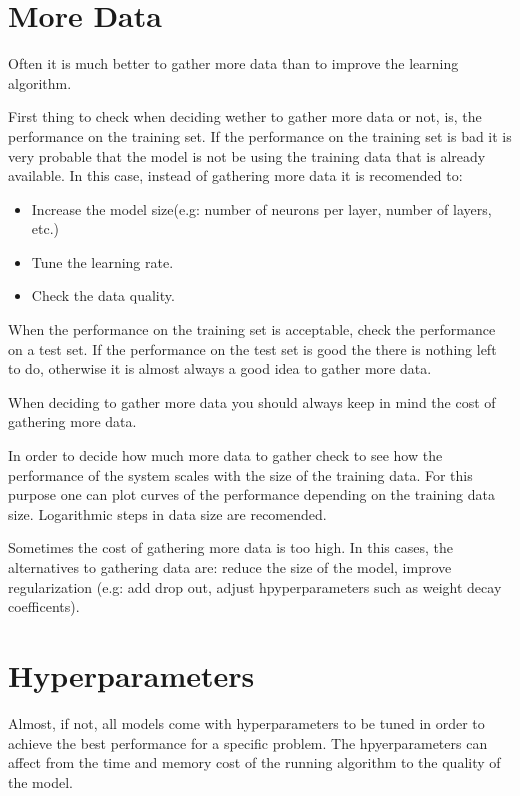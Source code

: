 \documentclass{tufte-handout}
\begin{document}
\section{More Data}\label{sec:more-data}
Often it is much better to gather more data than to improve the learning
algorithm.

First thing to check when deciding wether to gather more data or not, is, the performance
on the training set. If the performance on the training set is bad it is very
probable that the model is not be using the training data that is already available.
In this case, instead of gathering more data it is recomended to:
\begin{itemize}
    \item Increase the model size(e.g: number of neurons per layer, number of layers,
        etc.)
    \item Tune the learning rate.
    \item Check the data quality.
\end{itemize}

When the performance on the training set is acceptable, check the performance on
a test set. If the performance on the test set is good the there is nothing left 
to do, otherwise it is almost always a good idea to gather more data.

When deciding to gather more data you should always keep in mind the cost of 
gathering more data.

In order to decide how much more data to gather check to see how the performance of
the system scales with the size of the training data. For this purpose one can
plot curves of the performance depending on the training data size. Logarithmic 
steps in data size are recomended.

Sometimes the cost of gathering more data is too high. In this cases, the
alternatives to gathering data are: reduce the size of the model, improve
regularization (e.g: add drop out, adjust hpyperparameters such as weight decay
coefficents).

\section{Hyperparameters}\label{sec:hyperparameters}
Almost, if not, all models come with hyperparameters to be tuned in order to achieve
the best performance for a specific problem. The hpyerparameters can affect from the
time and memory cost of the running algorithm to the quality of the model.
\end{document}
